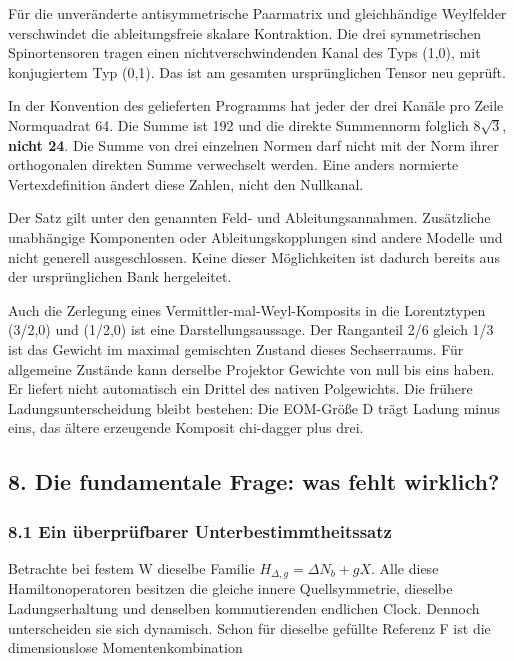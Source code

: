 Für die unveränderte antisymmetrische Paarmatrix und gleichhändige
Weylfelder verschwindet die ableitungsfreie skalare Kontraktion. Die
drei symmetrischen Spinortensoren tragen einen nichtverschwindenden
Kanal des Typs (1,0), mit konjugiertem Typ (0,1). Das ist am gesamten
ursprünglichen Tensor neu geprüft.

In der Konvention des gelieferten Programms hat jeder der drei Kanäle
pro Zeile Normquadrat 64. Die Summe ist 192 und die direkte Summennorm
folglich \(8\sqrt3\), \textbf{nicht 24}. Die Summe von drei einzelnen
Normen darf nicht mit der Norm ihrer orthogonalen direkten Summe
verwechselt werden. Eine anders normierte Vertexdefinition ändert diese
Zahlen, nicht den Nullkanal.

Der Satz gilt unter den genannten Feld- und Ableitungsannahmen.
Zusätzliche unabhängige Komponenten oder Ableitungskopplungen sind
andere Modelle und nicht generell ausgeschlossen. Keine dieser
Möglichkeiten ist dadurch bereits aus der ursprünglichen Bank
hergeleitet.

Auch die Zerlegung eines Vermittler-mal-Weyl-Komposits in die
Lorentztypen (3/2,0) und (1/2,0) ist eine Darstellungsaussage. Der
Ranganteil 2/6 gleich 1/3 ist das Gewicht im maximal gemischten Zustand
dieses Sechserraums. Für allgemeine Zustände kann derselbe Projektor
Gewichte von null bis eins haben. Er liefert nicht automatisch ein
Drittel des nativen Polgewichts. Die frühere Ladungsunterscheidung
bleibt bestehen: Die EOM-Größe D trägt Ladung minus eins, das ältere
erzeugende Komposit chi-dagger plus drei.

\subsection{8. Die fundamentale Frage: was fehlt
wirklich?}\label{die-fundamentale-frage-was-fehlt-wirklich}

\subsubsection{8.1 Ein überprüfbarer
Unterbestimmtheitssatz}\label{ein-uxfcberpruxfcfbarer-unterbestimmtheitssatz}

Betrachte bei festem W dieselbe Familie \(H_{\Delta,g}=\Delta N_b+gX\).
Alle diese Hamiltonoperatoren besitzen die gleiche innere
Quellsymmetrie, dieselbe Ladungserhaltung und denselben kommutierenden
endlichen Clock. Dennoch unterscheiden sie sich dynamisch. Schon für
dieselbe gefüllte Referenz F ist die dimensionslose Momentenkombination

